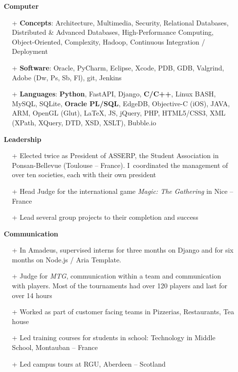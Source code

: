 \documentclass{res}
\begin{document}
\begin{resume}
        \begin{itemize}
        \item[] \faLaptopCode~\textbf{Computer}
                \begin{itemize}
                  \item[+] \textbf{Concepts}: Architecture, Multimedia, Security, Relational Databases, Distributed \& Advanced Databases, High-Performance Computing, Object-Oriented, Complexity, Hadoop, Continuous Integration / Deployment
                  \item[+] \textbf{Software}: Oracle, PyCharm, Eclipse, Xcode, PDB, GDB, Valgrind, Adobe (Dw, Ps, Sb, Fl), git, Jenkins
                  \item[+] \textbf{Languages}: \textbf{Python}, FastAPI, Django, \textbf{C/C++}, Linux BASH, MySQL, SQLite, \textbf{Oracle PL/SQL}, EdgeDB, Objective-C (iOS), JAVA, ARM, OpenGL (Glut), \LaTeX{}, JS, jQuery, PHP, HTML5/CSS3, XML (XPath, XQuery, DTD, XSD, XSLT), Bubble.io
                \end{itemize}
        \end{itemize}

        \begin{itemize}
        \item[] \faHandshake[regular]~\textbf{Leadership}
                \begin{itemize}
                   \item[+] Elected twice as President of ASSERP, the Student Association in Ponsan-Bellevue (Toulouse -- France). I~coordinated the management of over ten societies, each with their own president
                  \item[+] Head Judge for the international game \textit{Magic: The Gathering} in Nice -- France
                  \item[+] Lead several group projects to their completion and success
                \end{itemize}   
        \end{itemize}
        
        \begin{itemize}
        \item[] \faComments[regular]~\textbf{Communication}
            \begin{itemize}
							\item[+] In Amadeus, supervised interns for three months on Django and for six months on Node.js / Aria Template.
                \item[+] Judge for \textit{MTG}, communication within a team and communication with players. Most of the tournaments had over 120 players and last for over 14 hours
                \item[+] Worked as part of customer facing teams in Pizzerias, Restaurants, Tea house
                \item[+] Led training courses for students in school: Technology in Middle School, Montauban -- France
                \item[+] Led campus tours at RGU, Aberdeen -- Scotland
            \end{itemize} 
        \end{itemize}


\end{resume}
\end{document}
